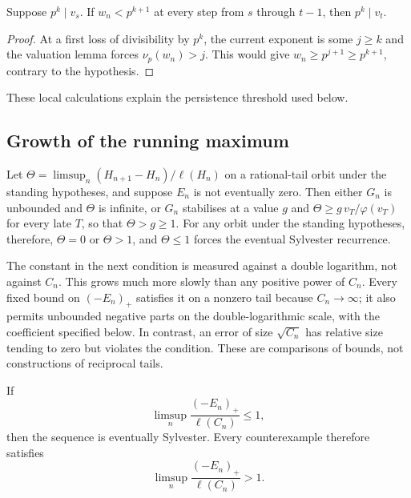 \documentclass[11pt]{article}
\begin{document}
\begin{corollary}\label{long243:res:powerpersistence}
Suppose $p^k\mid v_s$. If $w_n<p^{k+1}$ at every step from $s$ through
$t-1$, then $p^k\mid v_t$.
\end{corollary}
\begin{proof}
At a first loss of divisibility by $p^k$, the current exponent is some
$j\ge k$ and the valuation lemma forces $\nu_p(w_n)>j$. This would give
$w_n\ge p^{j+1}\ge p^{k+1}$, contrary to the hypothesis.
\end{proof}
These local calculations explain the persistence threshold used below.

\subsection{Growth of the running maximum}

\begin{theorem}\label{long243:res:recorddichotomy}
Let $\Theta=\limsup_n(H_{n+1}-H_n)/\ell(H_n)$ on a rational-tail orbit
under the standing hypotheses, and suppose $E_n$ is not eventually zero.
Then either $G_n$ is unbounded and $\Theta$ is infinite, or
$G_n$ stabilises at a value $g$ and $\Theta\ge g\,v_T/\varphi(v_T)$ for every
late $T$, so that $\Theta>g\ge1$.  For any orbit under the standing
hypotheses, therefore, $\Theta=0$ or $\Theta>1$, and $\Theta\le1$ forces
the eventual Sylvester recurrence.
\end{theorem}

The constant in the next condition is measured against a double
logarithm, not against $C_n$. This grows much more slowly than any
positive power of $C_n$. Every fixed bound on $(-E_n)_+$ satisfies
it on a nonzero tail because $C_n\to\infty$; it also permits unbounded
negative parts on the double-logarithmic scale, with the coefficient
specified below. In contrast, an error of size
$\sqrt{C_n}$ has relative size tending to zero but violates the condition.
These are comparisons of bounds, not constructions of reciprocal tails.

\begin{corollary}\label{long243:res:loglogboundary}
If
\[
 \limsup_n\frac{(-E_n)_+}{\ell(C_n)}\le1,
\]
then the sequence is eventually Sylvester. Every counterexample therefore
satisfies
\[
 \limsup_n\frac{(-E_n)_+}{\ell(C_n)}>1.
\]
\end{corollary}
\end{document}
